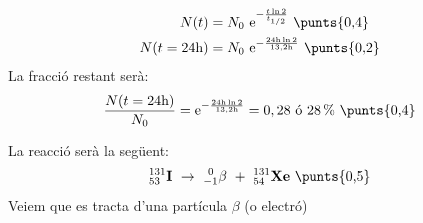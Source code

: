\begin{solapartat}
\begin{align*}
N(t) &= N_0\ \mathrm{e}^{-\frac{t\ln 2}{t_{1/2}}} \ \text{\punts{0,4}}\\
N(t = 24\mathrm{h}) &= N_0\ \mathrm{e}^{-\frac{24\mathrm{h}\ln 2}{13,2\mathrm{h}}} \ \text{\punts{0,2}}
\end{align*}
La fracció restant serà:
\[ \frac{N(t = 24\mathrm{h})}{N_0} = \mathrm{e}^{-\frac{24\mathrm{h}\ln 2}{13,2\mathrm{h}}} = 0,28\ \text{ó}\ 28\,\% \ \text{\punts{0,4}} \]
\end{solapartat}

\begin{solapartat}
La reacció serà la següent:
\[ ^{131}_{53}\mathbf{I} \ \to\ ^{\ 0}_{-1}\beta \ +\ ^{131}_{54}\mathbf{Xe} \ \text{\punts{0,5}} \]
Veiem que es tracta d'una partícula $\beta$ (o electró) 
\end{solapartat}
